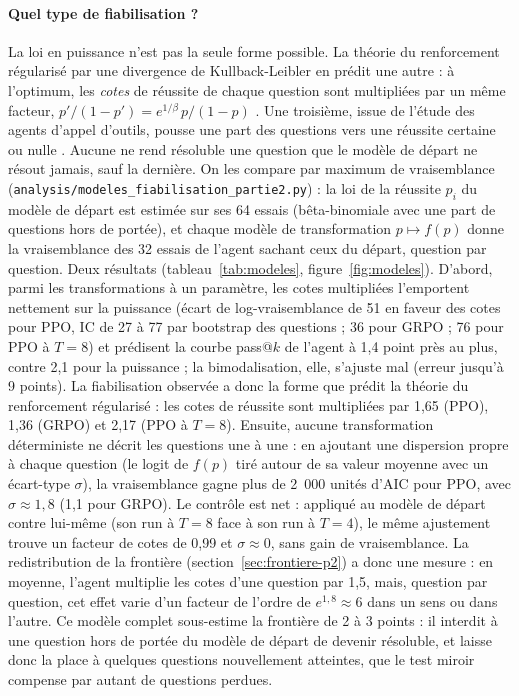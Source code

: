 \paragraph{Quel type de fiabilisation ?} La loi en puissance n'est pas la seule forme possible. La théorie du renforcement régularisé par une divergence de Kullback-Leibler en prédit une autre : à l'optimum, les \emph{cotes} de réussite de chaque question sont multipliées par un même facteur, $p'/(1-p') = e^{1/\beta}\,p/(1-p)$ \citep[annexe B]{matrenok2026controlling}. Une troisième, issue de l'étude des agents d'appel d'outils, pousse une part des questions vers une réussite certaine ou nulle \citep[théorème 2]{oh2026sharpening}. Aucune ne rend résoluble une question que le modèle de départ ne résout jamais, sauf la dernière. On les compare par maximum de vraisemblance (\texttt{analysis/modeles\_fiabilisation\_partie2.py}) : la loi de la réussite $p_i$ du modèle de départ est estimée sur ses 64 essais (bêta-binomiale avec une part de questions hors de portée), et chaque modèle de transformation $p \mapsto f(p)$ donne la vraisemblance des 32 essais de l'agent sachant ceux du départ, question par question. Deux résultats (tableau~\ref{tab:modeles}, figure~\ref{fig:modeles}). D'abord, parmi les transformations à un paramètre, les cotes multipliées l'emportent nettement sur la puissance (écart de log-vraisemblance de 51 en faveur des cotes pour PPO, IC de 27 à 77 par bootstrap des questions ; 36 pour GRPO ; 76 pour PPO à $T = 8$) et prédisent la courbe pass@$k$ de l'agent à 1,4 point près au plus, contre 2,1 pour la puissance ; la bimodalisation, elle, s'ajuste mal (erreur jusqu'à 9 points). La fiabilisation observée a donc la forme que prédit la théorie du renforcement régularisé : les cotes de réussite sont multipliées par 1,65 (PPO), 1,36 (GRPO) et 2,17 (PPO à $T = 8$). Ensuite, aucune transformation déterministe ne décrit les questions une à une : en ajoutant une dispersion propre à chaque question (le logit de $f(p)$ tiré autour de sa valeur moyenne avec un écart-type $\sigma$), la vraisemblance gagne plus de 2~000 unités d'AIC pour PPO, avec $\sigma \approx 1{,}8$ (1,1 pour GRPO). Le contrôle est net : appliqué au modèle de départ contre lui-même (son run à $T = 8$ face à son run à $T = 4$), le même ajustement trouve un facteur de cotes de 0,99 et $\sigma \approx 0$, sans gain de vraisemblance. La redistribution de la frontière (section~\ref{sec:frontiere-p2}) a donc une mesure : en moyenne, l'agent multiplie les cotes d'une question par 1,5, mais, question par question, cet effet varie d'un facteur de l'ordre de $e^{1{,}8} \approx 6$ dans un sens ou dans l'autre. Ce modèle complet sous-estime la frontière de 2 à 3 points : il interdit à une question hors de portée du modèle de départ de devenir résoluble, et laisse donc la place à quelques questions nouvellement atteintes, que le test miroir compense par autant de questions perdues.


